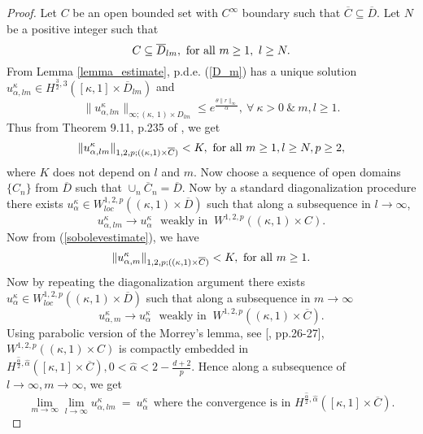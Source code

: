\documentclass[11pt]{amsart}
\numberwithin{equation}{section}
\begin{document}
\begin{proof} Let $C  $ be an  open bounded  set with $C^\infty$ boundary such that  
$\overline{C} \subseteq \overline{D}.$ 
Let $N$ be a positive integer such that $$C \subseteq \overline{D}_{lm}, \ {\rm for \ all \ } m\geq 1, \
l \geq N . $$ 
From Lemma \ref{lemma_estimate}, p.d.e. (\ref{D_m}) has a unique solution 
 $u^{\kappa}_{\alpha,lm} \in     H^{\frac{3}{2},3}([\kappa,1]\times \overline{D}_{lm}) $ and   
\begin{equation}
 \|u^{\kappa}_{\alpha,lm}\|_{\infty; (\kappa, \ 1) \times D_{lm}}\leq e^{\frac{\theta \|r\|_{\infty}}{\alpha}}, \ 
\forall\ \kappa >0 \ \& \ m,l\geq 1. \nonumber
\end{equation}
Thus from Theorem 9.11, p.235 of \cite{gilbarg_trudinger}, we get
  \begin{equation}\label{sobolevestimate}
  \|u^{\kappa}_{\alpha,lm}\|_{1,2,p ; ((\kappa,1) \times \overline{C}) } < K, \ {\rm for \ all \ }  m \geq 1,
 l\geq N,  p \geq 2,
 \end{equation}
 where $K$ does not depend on $l$ and $m$. 
Now choose a sequence of open domains $\{ C_n\}$  from $\overline{D}$  such that 
$\cup_n \overline{C}_n = \overline{D}$. Now by a standard diagonalization procedure there exists 
$u^{\kappa}_{\alpha} \in W^{1,2,p}_{loc} ( (\kappa , 1) \times \overline{D})$ such that 
 along a  subsequence in $l \to \infty$,
\begin{equation}\label{weak}
u^{\kappa}_{\alpha,lm} \longrightarrow u^{\kappa}_{\alpha} \ \ \ \mbox{weakly in }  
\ W^{1,2,p}((\kappa,1) \times C) .
\end{equation}
Now from (\ref{sobolevestimate}), we have 
 \begin{equation}\label{sobolevestimate1}
  \|u^{\kappa}_{\alpha,m}\|_{1,2,p ; ((\kappa,1) \times \overline{C}) } < K, \ {\rm for \ all \ }  m \geq 1.
 \end{equation}
Now by repeating  the diagonalization argument there exists $u^\kappa_\alpha \in 
W^{1,2,p}_{loc} ( (\kappa , 1) \times \overline{D})$ such that along a subsequence in $m \to \infty$
\begin{equation}\label{weak1}
u^{\kappa}_{\alpha,m} \longrightarrow u^{\kappa}_{\alpha} \ \ \ \mbox{weakly in }  
\ W^{1,2,p}((\kappa,1) \times \overline{C}) .
\end{equation}
Using  parabolic version of the Morrey's lemma, see [\cite{WuYin}, pp.26-27],  $W^{1,2,p}((\kappa,1)\times C)$ is compactly embedded in  $H^{\frac{\hat{\alpha}}{2}, \hat{\alpha} } ([ \kappa, 1 ] \times 
\overline{C} ), 0 < \hat{\alpha} < 2 - \frac{d+2}{p}  $. 
Hence along a subsequence of $l \to \infty, m \to \infty$, we get 
\begin{equation}\label{C0}
\lim_{m \to \infty} \lim_{l \to \infty}u^{\kappa}_{\alpha,lm} \ = \  u^{\kappa}_{\alpha} \ \
 \mbox{where\ the\  convergence\ is\ in } 
H^{\frac{\hat{\alpha}}{2}, \hat{\alpha} } ([ \kappa, 1 ] \times \overline{C} ) .
\end{equation}




\end{proof}
\end{document}
